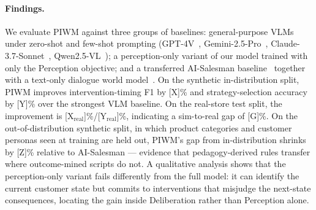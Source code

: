 \documentclass{article}
\begin{document}
\paragraph{Findings.}
We evaluate PIWM against three groups of baselines: general-purpose VLMs under zero-shot and few-shot prompting (GPT-4V~\cite{GPT4V}, Gemini-2.5-Pro~\cite{Gemini25}, Claude-3.7-Sonnet~\cite{Claude37}, Qwen2.5-VL~\cite{Qwen25VL}); a perception-only variant of our model trained with only the Perception objective; and a transferred AI-Salesman baseline~\cite{AISalesman} together with a text-only dialogue world model~\cite{XuCOLING}. On the synthetic in-distribution split, PIWM improves intervention-timing F1 by [X]\% and strategy-selection accuracy by [Y]\% over the strongest VLM baseline. On the real-store test split, the improvement is [X$_\text{real}$]\%/[Y$_\text{real}$]\%, indicating a sim-to-real gap of [G]\%. On the out-of-distribution synthetic split, in which product categories and customer personas seen at training are held out, PIWM's gap from in-distribution shrinks by [Z]\% relative to AI-Salesman --- evidence that pedagogy-derived rules transfer where outcome-mined scripts do not. A qualitative analysis shows that the perception-only variant fails differently from the full model: it can identify the current customer state but commits to interventions that misjudge the next-state consequences, locating the gain inside Deliberation rather than Perception alone.
\end{document}
